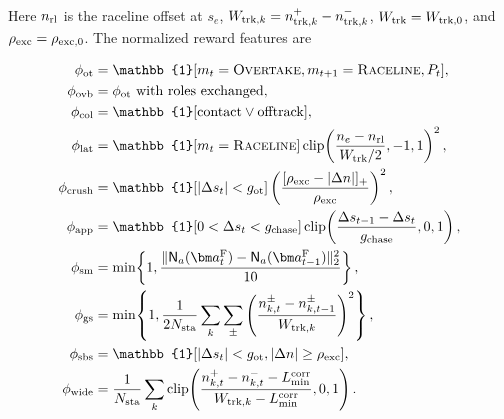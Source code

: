 \documentclass[sensors,article,submit,moreauthors]{Definitions/mdpi}
\begin{document}
\par\endgroup
\FloatBarrier

\noindent\begin{minipage}{\linewidth}
Here \(n_{\rm rl}\) is the raceline offset at \(s_e\),
\(W_{{\rm trk},k}=n_{{\rm trk},k}^{+}-n_{{\rm trk},k}^{-}\),
\(W_{\rm trk}=W_{{\rm trk},0}\), and
\(\rho_{\rm exc}=\rho_{{\rm exc},0}\). The normalized reward features are
\par
\begingroup
\normalsize
\setlength{\jot}{3pt}
\setlength{\abovedisplayskip}{4pt}
\setlength{\belowdisplayskip}{4pt}
\setlength{\abovedisplayshortskip}{4pt}
\setlength{\belowdisplayshortskip}{4pt}
\begin{equation}
\begin{aligned}
\phi_{\rm ot}&=\mathbb{1}[m_t=\textsc{Overtake},
m_{t+1}=\textsc{Raceline},P_t],\\
\phi_{\rm ovb}&=\phi_{\rm ot}\text{ with roles exchanged},\\
\phi_{\rm col}&=\mathbb{1}[\mathrm{contact}\vee\mathrm{offtrack}],\\
\phi_{\rm lat}&=\mathbb{1}[m_t=\textsc{Raceline}]
\operatorname{clip}\!\left(\frac{n_e-n_{\rm rl}}{W_{\rm trk}/2},-1,1\right)^2,\\
\phi_{\rm crush}&=\mathbb{1}[|\Delta s_t|<g_{\rm ot}]
\left(\frac{[\rho_{\rm exc}-|\Delta n|]_+}{\rho_{\rm exc}}\right)^2,\\
\phi_{\rm app}&=\mathbb{1}[0<\Delta s_t<g_{\rm chase}]
\operatorname{clip}\!\left(\frac{\Delta s_{t-1}-\Delta s_t}{g_{\rm chase}},0,1\right),\\
\phi_{\rm sm}&=\min\!\left\{1,
\frac{\|\mathsf N_a(\bm a_t^{\rm F})-
\mathsf N_a(\bm a_{t-1}^{\rm F})\|_2^2}{10}\right\},\\
\phi_{\rm gs}&=\min\!\left\{1,\frac{1}{2N_{\rm sta}}
\sum_k\sum_{\pm}\left(\frac{n_{k,t}^{\pm}-n_{k,t-1}^{\pm}}
{W_{{\rm trk},k}}\right)^2\right\},\\
\phi_{\rm sbs}&=\mathbb{1}[|\Delta s_t|<g_{\rm ot},
|\Delta n|\ge\rho_{\rm exc}],\\
\phi_{\rm wide}&=\frac{1}{N_{\rm sta}}\sum_k
\operatorname{clip}\!\left(\frac{n_{k,t}^+-n_{k,t}^--L_{\min}^{\rm corr}}
{W_{{\rm trk},k}-L_{\min}^{\rm corr}},0,1\right).
\end{aligned}
\label{eq:reward_features}
\end{equation}
\endgroup
\end{minipage}\par
\end{document}
